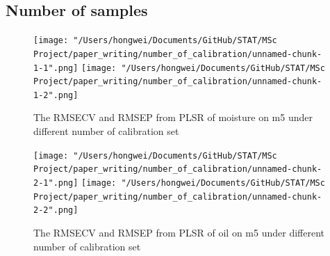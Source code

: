 \documentclass[a4paper,12pt,titlepage]{article} %
\numberwithin{equation}{section}  %
\begin{document}
	
	\begin{appendices}
		\section{Number of samples}
		\label{app:Number_of_samples}
			
			\begin{figure}[h]    %
			\centering           %
			\texttt{[image: "/Users/hongwei/Documents/GitHub/STAT/MSc Project/paper\_writing/number\_of\_calibration/unnamed-chunk-1-1".png]}  %
			\texttt{[image: "/Users/hongwei/Documents/GitHub/STAT/MSc Project/paper\_writing/number\_of\_calibration/unnamed-chunk-1-2".png]}  %
			\caption{The RMSECV and RMSEP from PLSR of moisture on m5 under different number of calibration set}          %
			\label{fig:calibration_1-1}               %
			\end{figure}                        %

			\begin{figure}[h]    %
	\centering           %
	\texttt{[image: "/Users/hongwei/Documents/GitHub/STAT/MSc Project/paper\_writing/number\_of\_calibration/unnamed-chunk-2-1".png]}  %
	\texttt{[image: "/Users/hongwei/Documents/GitHub/STAT/MSc Project/paper\_writing/number\_of\_calibration/unnamed-chunk-2-2".png]}  %
	\caption{The RMSECV and RMSEP from PLSR of oil on m5 under different number of calibration set}          %
	\label{fig:calibration_2-1}               %
\end{figure}                        %



\end{appendices}
\end{document}
